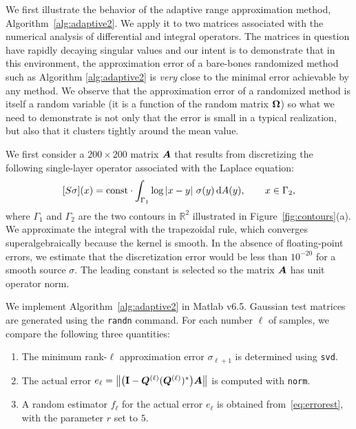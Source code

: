 \documentclass[final]{siamltex}
\begin{document}
We first illustrate the behavior of the adaptive range approximation
method, Algorithm~\ref{alg:adaptive2}. We apply it to two matrices
associated with the numerical analysis of differential and integral
operators. The matrices in question have rapidly decaying singular
values and our intent is to demonstrate that in this environment,
the approximation error of a bare-bones randomized method
such as Algorithm \ref{alg:adaptive2} is \emph{very} close to
the minimal error achievable by any method. We observe that the
approximation error of a randomized method is itself a random variable
(it is a function of the random matrix $\bm{\Omega}$) so what we
need to demonstrate is not only that the error is small in a typical
realization, but also that it clusters tightly around the
mean value.

We first consider a $200 \times 200$ matrix $\bm{A}$ that results
from discretizing the following single-layer operator
associated with the Laplace equation:
\begin{equation} \label{eq:int_op_laplace}
[S \sigma](x) = {\rm const} \cdot \int_{\Gamma_1} \log \abs{x-y} \, \sigma(y) \idiff{A(y)},
\qquad x \in \Gamma_2,
\end{equation}
where $\Gamma_1$ and $\Gamma_2$ are the two contours in $\mathbb{R}^2$
illustrated in Figure~\ref{fig:contours}(a).  We approximate
the integral with the trapezoidal rule, which converges superalgebraically
because the kernel is smooth.  In the absence of floating-point errors,
we estimate that the discretization error would be less than $10^{-20}$
for a smooth source $\sigma$.  The leading constant is selected so the
matrix $\bm{A}$ has unit operator norm.

We implement Algorithm~\ref{alg:adaptive2} in Matlab v6.5.
Gaussian test matrices are generated using the {\tt randn} command.
For each number $\ell$ of samples, we compare the following three quantities:
\lsp
\begin{enumerate}
\item   The minimum rank-$\ell$ approximation error $\sigma_{\ell+1}$ is determined using {\tt svd}.

\item   The actual error
$e_{\ell} = \left\Vert {\big(\mathbf{I}- \bm{Q}^{(\ell)}(\bm{Q}^{(\ell)})^{*} \big)\bm{A}} \right\Vert$
is computed with {\tt norm}.

\item   A random estimator $f_\ell$ for the actual error $e_{\ell}$ is obtained from~\eqref{eq:errorest},
        with the parameter $r$ set to $5$.
\end{enumerate}
\end{document}

